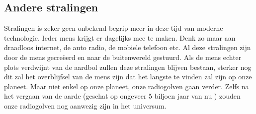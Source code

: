 \subsection{Andere stralingen}
Stralingen is zeker geen onbekend begrip meer in deze tijd van moderne technologie. Ieder mens krijgt er dagelijks mee te maken. Denk zo maar aan draadloos internet, de auto radio, de mobiele telefoon etc. Al deze stralingen zijn door de mens gecre\"{e}erd en naar de buitenwereld gestuurd. 
\newline
Als de mens echter plots verdwijnt van de aardbol zullen deze stralingen blijven bestaan, sterker nog dit zal het overblijfsel van de mens zijn dat het langste te vinden zal zijn op onze planeet. Maar niet enkel op onze planeet, onze radiogolven gaan verder. Zelfs na het vergaan van de aarde (geschat op ongeveer 5 biljoen jaar van nu \cite{WorldWithoutUs}) zouden onze radiogolven nog aanwezig zijn in het universum.
\newpage
